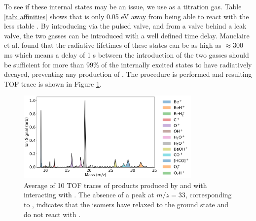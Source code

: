 To see if these internal states may be an issue, we use  as a titration gas. Table \ref{tab: affinities} shows that  is only 0.05 eV away from being able to react with the less stable . By introducing  via the pulsed valve, and  from a valve behind a leak valve, the two gasses can be introduced with a well defined time delay. Mauclaire et al. found that the radiative lifetimes of these states can be as high as $\approx 300$ ms\cite{Mauclaire1995} which means a delay of 1 s between the introduction of the two gasses should be sufficient for more than 99\% of the internally excited states to have radiatively decayed, preventing any production of . The procedure is performed and resulting TOF trace is shown in Figure \ref{fig: O2 titration}.

\begin{figure}
	\centering
	\includegraphics[width=0.8\textwidth]{images/O2_titration.png}
	\caption{Average of 10 TOF traces of products produced by  and  with  interacting with . The absence of a peak at $m/z=33$, corresponding to , indicates that the isomers \ce{[HCO]+} have relaxed to the ground state and do not react with .}
	\label{fig: O2 titration}
\end{figure}

